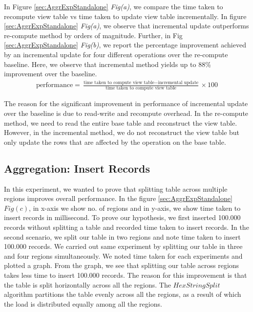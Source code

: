 \documentclass[11pt,a4paper,bibtotoc,idxtotoc,headsepline,footsepline,footexclude,BCOR12mm,DIV13]{scrbook}
\begin{document}
In Figure \ref{sec:AggrExpStandalone} \emph{Fig(a)}, we compare the time taken to recompute view table vs time taken to update view table incrementally. In figure \ref{sec:AggrExpStandalone} \emph{Fig(a)}, we observe that incremental update outperforms re-compute method by orders of magnitude. Further, in Fig \ref{sec:AggrExpStandalone} \emph{Fig(b)}, we report the percentage improvement achieved by an incremental update for four different operations over the re-compute baseline. Here, we observe that incremental method yields up to 88\% improvement over the baseline.
\newline
\begin{align*}
\text{performance} = \frac{\text{time taken to compute view table} - \text{incremental update}}{\text{time taken to compute view table}} \times 100
\end{align*}
	 
The reason for the significant improvement in performance of incremental update over the baseline is due to read-write and recompute overhead.
In the re-compute method, we need to read the entire base table and
reconstruct the view table. However, in the incremental method, we do not reconstruct the view table but only update the rows that are affected by the operation on the base table. 

\subsection{Aggregation: Insert Records}
\label{Insert Records Aggr}

In this experiment, we wanted to prove that splitting table across multiple regions improves overall performance. In the figure \ref{sec:AggrExpStandalone} $Fig(c)$, in x-axis we show no. of regions and in y-axis, we show time taken to insert records in millisecond. To prove our hypothesis, we first inserted 100.000 records without splitting a table and recorded time taken to insert records. In the second scenario, we split our table in two regions and note time taken to insert 100.000 records. We carried out same experiment by splitting our table in three and four regions simultaneously. We noted time taken for each experiments and plotted a graph. From the graph, we see that splitting our table across regions takes less time to insert 100.000 records. The reason for this improvement is that the table is split horizontally across all the regions. The $HexStringSplit$ algorithm partitions the table evenly across all the regions, as a result of which the load is distributed equally among all the regions.
\end{document}
